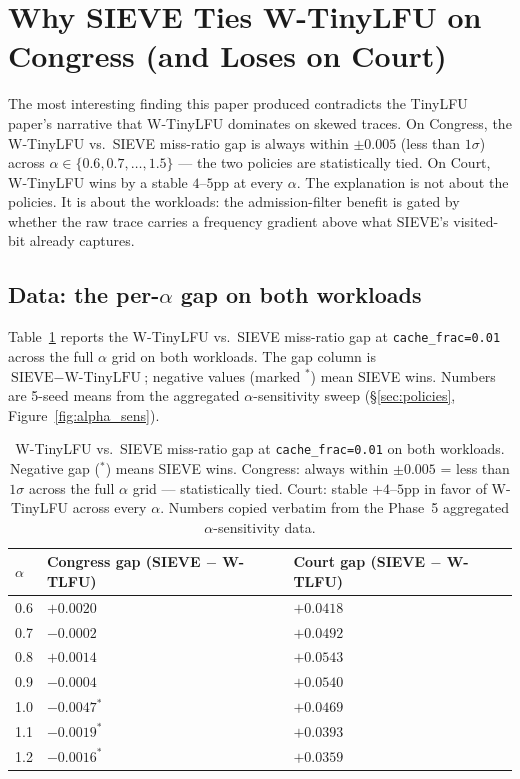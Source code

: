 \section{Why SIEVE Ties W-TinyLFU on Congress (and Loses on Court)}\label{sec:mechanism}

The most interesting finding this paper produced contradicts the TinyLFU
paper's narrative that W-TinyLFU dominates on skewed traces. On Congress, the
W-TinyLFU vs.\ SIEVE miss-ratio gap is always within $\pm 0.005$ (less than
$1\sigma$) across $\alpha \in \{0.6, 0.7, \dots, 1.5\}$ --- the two policies are
statistically tied. On Court, W-TinyLFU wins by a stable $4$--$5$pp at every
$\alpha$. The explanation is not about the policies. It is about the
workloads: the admission-filter benefit is gated by whether the raw trace
carries a frequency gradient above what SIEVE's visited-bit already captures.

\subsection{Data: the per-$\alpha$ gap on both workloads}

Table~\ref{tab:mechanism_gap} reports the W-TinyLFU vs.\ SIEVE miss-ratio gap
at \texttt{cache\_frac=0.01} across the full $\alpha$ grid on both workloads.
The gap column is $\text{SIEVE} - \text{W-TinyLFU}$; negative values (marked
$^*$) mean SIEVE wins. Numbers are 5-seed means from the aggregated
$\alpha$-sensitivity sweep (\S\ref{sec:policies}, Figure~\ref{fig:alpha_sens}).

\begin{table}[h]
\centering
\footnotesize
\renewcommand{\arraystretch}{0.92}
\begin{tabularx}{\textwidth}{@{}lXX@{}}
\toprule
$\alpha$ & \textbf{Congress gap (SIEVE $-$ W-TLFU)} & \textbf{Court gap (SIEVE $-$ W-TLFU)} \\
\midrule
0.6 & $+0.0020$      & $+0.0418$ \\
0.7 & $-0.0002$      & $+0.0492$ \\
0.8 & $+0.0014$      & $+0.0543$ \\
0.9 & $-0.0004$      & $+0.0540$ \\
1.0 & $-0.0047^{*}$  & $+0.0469$ \\
1.1 & $-0.0019^{*}$  & $+0.0393$ \\
1.2 & $-0.0016^{*}$  & $+0.0359$ \\
\bottomrule
\end{tabularx}
\caption{W-TinyLFU vs.\ SIEVE miss-ratio gap at \texttt{cache\_frac=0.01} on
both workloads. Negative gap ($^{*}$) means SIEVE wins. Congress: always
within $\pm 0.005$ = less than $1\sigma$ across the full $\alpha$ grid ---
statistically tied. Court: stable $+4$--$5$pp in favor of W-TinyLFU across
every $\alpha$. Numbers copied verbatim from the Phase~5 aggregated
$\alpha$-sensitivity data.}
\label{tab:mechanism_gap}
\end{table}

